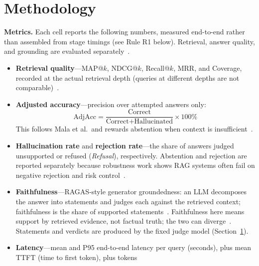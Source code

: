 
\section{Methodology}
\label{sec:method}

\textbf{Metrics.}
Each cell reports the following numbers, measured end-to-end rather than
assembled from stage timings (see Rule R1 below). Retrieval, answer
quality, and grounding are evaluated separately~\cite{murugaraj2025ragvue,mortaheb2025ragcheck}.

\begin{itemize}
    \item \textbf{Retrieval quality}---MAP@$k$, NDCG@$k$, Recall@$k$,
          MRR, and Coverage, recorded at the actual retrieval depth
          (queries at different depths are not comparable)~\cite{elkiran2026empirical}.
    \item \textbf{Adjusted accuracy}---precision over attempted answers
          only:
          \[
          \text{AdjAcc} = \frac{\text{Correct}}{\text{Correct} +
          \text{Hallucinated}} \times 100\%
          \]
          This follows Mala et al.\ and rewards abstention when context
          is insufficient~\cite{mala2026faithfulness}.
    \item \textbf{Hallucination rate} and \textbf{rejection rate}---the
          share of answers judged unsupported or refused
          (\emph{Refusal}), respectively. Abstention and rejection are
          reported separately because robustness work shows RAG systems
          often fail on negative rejection and risk control~\cite{chen2023rgb,chen2024counterfactual}.
    \item \textbf{Faithfulness}---RAGAS-style generator groundedness:
          an LLM decomposes the answer into statements and judges each
          against the retrieved context; faithfulness is the share of
          supported statements~\cite{es2023ragas}. Faithfulness here
          means support by retrieved evidence, not factual truth; the
          two can diverge~\cite{murugaraj2025ragvue}. Statements and
          verdicts are produced by the fixed judge model
          (Section~\ref{sec:method}).
    \item \textbf{Latency}---mean and P95 end-to-end latency per query
          (seconds), plus mean TTFT (time to first token), plus tokens

\end{itemize}
